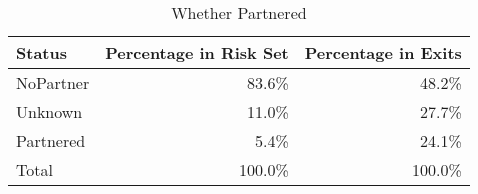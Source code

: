 \begin{table}[htpb]
\centering
\caption{Whether Partnered} 
\label{marriedTab}
\begin{tabular}{lrr}
  \toprule
\parbox[t]{0.2\textwidth}{\centering Status} & \parbox[t]{0.2\textwidth}{\centering Percentage in Risk Set} & \parbox[t]{0.2\textwidth}{\centering Percentage in Exits} \\ 
  \midrule
NoPartner & 83.6\% & 48.2\% \\ 
  Unknown & 11.0\% & 27.7\% \\ 
  Partnered & 5.4\% & 24.1\% \\ 
  Total & 100.0\% & 100.0\% \\ 
   \bottomrule
\end{tabular}
\end{table}

